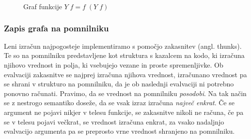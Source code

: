 \begin{figure*}[ht]
	\centering
	\begin{subfigure}[b]{0.45\textwidth}
		\centering
		\label{fig:funkcija-y-kot-prosta-spremenljivka}
	\end{subfigure}%
	\hfill
	\begin{subfigure}[b]{0.45\textwidth}
		\centering
		\label{fig:funkcija-y-kot-cikel}
	\end{subfigure}
	\caption{Graf funkcije $Y \; f = f \; (Y \; f)$}
	\label{fig:funkcija-y}
\end{figure*}

\subsubsection{Zapis grafa na pomnilniku}

Leni izračun najpogosteje implementiramo s pomočjo zakasnitev (angl. thunks). Te so na pomnilniku predstavljene kot struktura s kazalcem na kodo, ki izračuna njihovo vrednost in polja, ki vsebujejo vezane in proste spremenljivke. Ob evalvaciji zakasnitve se najprej izračuna njihova vrednost, iz\-ra\-ču\-na\-no vrednost pa se shrani v strukturo na pomnilniku, da je ob naslednji evalvaciji ni potrebno ponovno računati. Pravimo, da se vrednost na pomnilniku \textit{posodobi}. Na tak način se z nestrogo semantiko doseže, da se vsak izraz izračuna \textit{največ enkrat}. Če se argument ne pojavi nikjer v telesu funkcije, se zakasnitve nikoli ne računa, če pa se v telesu pojavi večkrat, se vrednost izračuna enkrat, za vsako nadaljnjo evalvacijo argumenta pa se preprosto vrne vrednost shranjeno na pomnilniku.

